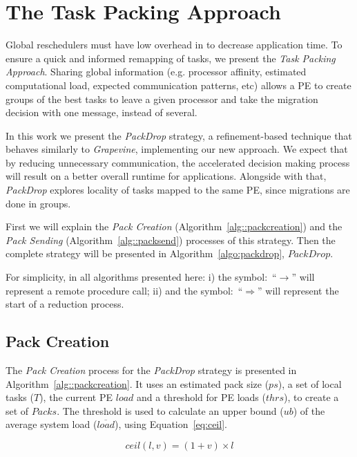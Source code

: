 \section{The Task Packing Approach}

Global reschedulers must have low overhead in to decrease application time.
To ensure a quick and informed remapping of tasks, we present the \textit{Task Packing Approach}.
Sharing global information (e.g. processor affinity, estimated computational load, expected communication patterns, etc) allows a PE to create groups of the best tasks to leave a given processor and take the migration decision with one message, instead of several.

In this work we present the \textit{PackDrop} strategy, a refinement-based technique that behaves similarly to \textit{Grapevine}, implementing our new approach.
We expect that by reducing unnecessary communication, the accelerated decision making process will result on a better overall runtime for applications.
Alongside with that, \textit{PackDrop} explores locality of tasks mapped to the same PE, since migrations are done in groups.

First we will explain the \textit{Pack Creation} (Algorithm~\ref{alg::packcreation}) and the \textit{Pack Sending} (Algorithm~\ref{alg::packsend}) processes of this strategy.
Then the complete strategy will be presented in Algorithm~\ref{algo:packdrop}, $PackDrop$.

For simplicity, in all algorithms presented here: i) the symbol:~``$\rightarrow$'' will represent a remote procedure call; ii) and the symbol:~``$\Rightarrow$'' will  represent the start of a reduction process.

\subsection{Pack Creation}

The \textit{Pack Creation} process for the \textit{PackDrop} strategy is presented in Algorithm~\ref{alg::packcreation}.
It uses an estimated pack size ($ps$), a set of local tasks ($T$), the current PE $load$ and a threshold for PE loads ($thrs$), to create a set of $Packs$.
The threshold is used to calculate an upper bound ($ub$) of the average system load ($\overline{load}$), using Equation~\ref{eq:ceil}. 

\begin{equation}
	ceil(l,v) = (1+v)\times l
    \label{eq:ceil}
\end{equation}


